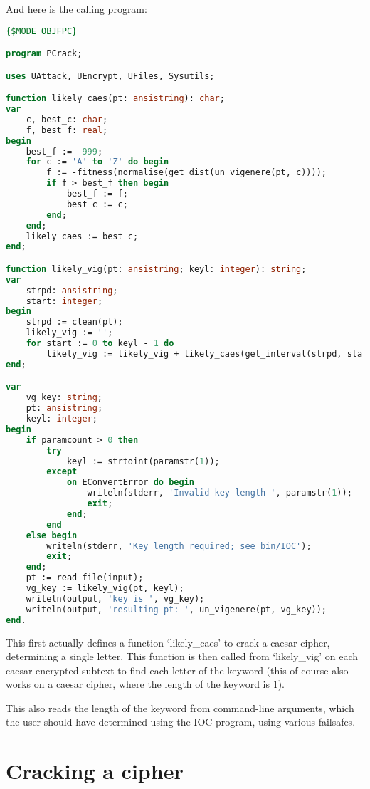 \documentclass[fleqn,a4paper,11pt]{article}
\begin{document}
    And here is the calling program:

\begin{lstlisting}[language=Pascal, caption=Keyword-cracking program (PCrack.pas)]
{$MODE OBJFPC}

program PCrack;

uses UAttack, UEncrypt, UFiles, Sysutils;

function likely_caes(pt: ansistring): char;
var
    c, best_c: char;
    f, best_f: real;
begin
    best_f := -999;
    for c := 'A' to 'Z' do begin
        f := -fitness(normalise(get_dist(un_vigenere(pt, c))));
        if f > best_f then begin
            best_f := f;
            best_c := c;
        end;
    end;
    likely_caes := best_c;
end;

function likely_vig(pt: ansistring; keyl: integer): string;
var
    strpd: ansistring;
    start: integer;
begin
    strpd := clean(pt);
    likely_vig := '';
    for start := 0 to keyl - 1 do
        likely_vig := likely_vig + likely_caes(get_interval(strpd, start, keyl));
end;

var
    vg_key: string;
    pt: ansistring;
    keyl: integer;
begin
    if paramcount > 0 then
        try
            keyl := strtoint(paramstr(1));
        except
            on EConvertError do begin
                writeln(stderr, 'Invalid key length ', paramstr(1));
                exit;
            end;
        end
    else begin
        writeln(stderr, 'Key length required; see bin/IOC');
        exit;
    end;
    pt := read_file(input);
    vg_key := likely_vig(pt, keyl);
    writeln(output, 'key is ', vg_key);
    writeln(output, 'resulting pt: ', un_vigenere(pt, vg_key));
end.
\end{lstlisting}
\iffalse $ \fi %

    This first actually defines a function `likely\_caes' to crack a caesar
    cipher, determining a single letter. This function is then called from
    `likely\_vig' on each caesar-encrypted subtext to find each letter of the
    keyword (this of course also works on a caesar cipher, where the length of
    the keyword is 1).

    This also reads the length of the keyword from command-line arguments,
    which the user should have determined using the IOC program, using various
    failsafes.

    \section{Cracking a cipher}
\end{document}
